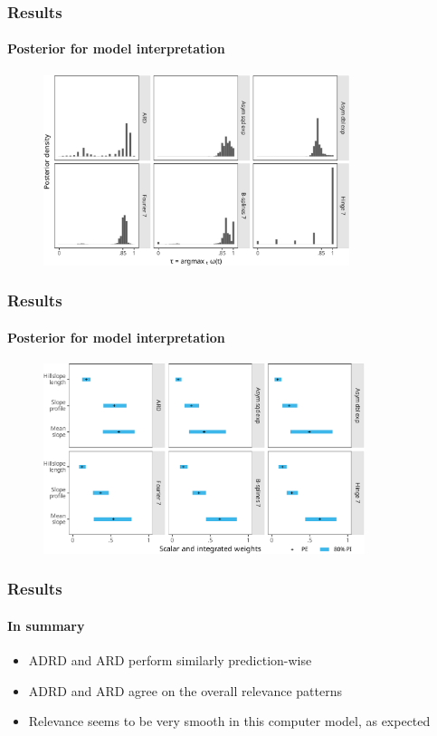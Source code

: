 \documentclass{snedecorbeamer}
\begin{document}
\begin{frame}
  \frametitle{Results}
  \framesubtitle{Posterior for model interpretation}

  \begin{figure}
    \centering
    \includegraphics[height=15em]{inc/wepp_weight_argmax_tiny_fsc140.pdf}
  \end{figure}

\end{frame}

\begin{frame}
  \frametitle{Results}
  \framesubtitle{Posterior for model interpretation}

  \begin{figure}
    \centering
    \includegraphics[height=15em]{inc/wepp_weight_integral_tiny_fsc140.pdf}
  \end{figure}

\end{frame}

\begin{frame}
  \frametitle{Results}
  \framesubtitle{In summary}

  \begin{itemize}
  \item \textsc{ADRD} and \textsc{ARD} perform similarly prediction-wise
  \item \textsc{ADRD} and \textsc{ARD} agree on the overall relevance patterns
  \item Relevance seems to be very smooth in this computer model, as expected
  \end{itemize}
\end{frame}
\end{document}
